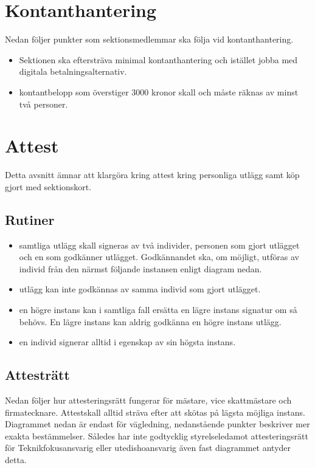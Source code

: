 \documentclass{dsekprotokoll}
\begin{document}
\section{Kontanthantering}
Nedan följer punkter som sektionsmedlemmar ska följa vid kontanthantering.
\begin{itemize}
    \item Sektionen ska eftersträva minimal kontanthantering och istället jobba med digitala betalningsalternativ.
    \item kontantbelopp som överstiger 3000 kronor skall och måste räknas av minst två personer.
\end{itemize}

\section{Attest}
Detta avsnitt ämnar att klargöra kring attest kring personliga utlägg samt köp gjort med sektionskort.

\subsection{Rutiner}
\begin{itemize}
    \item samtliga utlägg skall signeras av två individer, personen som gjort utlägget och en som godkänner utlägget. Godkännandet ska, om möjligt, utföras av individ från den närmst följande instansen enligt diagram nedan.
    \item utlägg kan inte godkännas av samma individ som gjort utlägget.
    \item en högre instans kan i samtliga fall ersätta en lägre instans signatur om så behövs. En lägre instans kan aldrig godkänna en högre instans utlägg.
    \item en individ signerar alltid i egenskap av sin högsta instans.
\end{itemize}

\subsection{Attesträtt}
Nedan följer hur attesteringsrätt fungerar för mästare, vice skattmästare och firmatecknare. Attestskall alltid sträva efter att skötas på lägsta möjliga instans. Diagrammet nedan är endast för vägledning, nedanstående punkter beskriver mer exakta bestämmelser. Således har inte godtycklig styrelseledamot attesteringsrätt för Teknikfokusansvarig eller utedishoansvarig även fast diagrammet antyder detta.
\end{document}
